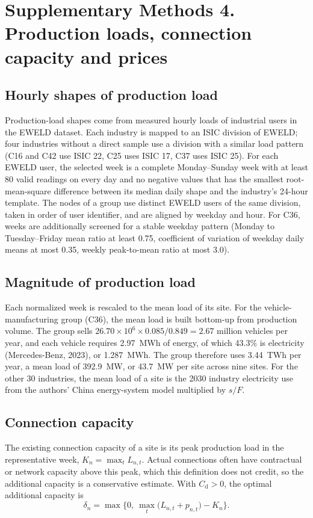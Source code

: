 \documentclass[11pt]{article}
\begin{document}
\section*{Supplementary Methods 4. Production loads, connection capacity and prices}

\subsection*{Hourly shapes of production load}
Production-load shapes come from measured hourly loads of industrial users in the EWELD dataset. Each industry is mapped to an ISIC division of EWELD; four industries without a direct sample use a division with a similar load pattern (C16 and C42 use ISIC 22, C25 uses ISIC 17, C37 uses ISIC 25). For each EWELD user, the selected week is a complete Monday--Sunday week with at least 80 valid readings on every day and no negative values that has the smallest root-mean-square difference between its median daily shape and the industry's 24-hour template. The nodes of a group use distinct EWELD users of the same division, taken in order of user identifier, and are aligned by weekday and hour. For C36, weeks are additionally screened for a stable weekday pattern (Monday to Tuesday--Friday mean ratio at least 0.75, coefficient of variation of weekday daily means at most 0.35, weekly peak-to-mean ratio at most 3.0).

\subsection*{Magnitude of production load}
Each normalized week is rescaled to the mean load of its site. For the vehicle-manufacturing group (C36), the mean load is built bottom-up from production volume. The group sells $26.70\times10^6\times0.085/0.849=2.67$ million vehicles per year, and each vehicle requires 2.97~MWh of energy, of which 43.3\% is electricity (Mercedes-Benz, 2023), or 1.287~MWh. The group therefore uses 3.44~TWh per year, a mean load of 392.9~MW, or 43.7~MW per site across nine sites. For the other 30 industries, the mean load of a site is the 2030 industry electricity use from the authors' China energy-system model multiplied by $s/F$.

\subsection*{Connection capacity}
The existing connection capacity of a site is its peak production load in the representative week, $K_n=\max_tL_{n,t}$. Actual connections often have contractual or network capacity above this peak, which this definition does not credit, so the additional capacity is a conservative estimate. With $C_{\mathrm{d}}>0$, the optimal additional capacity is
\begin{equation}
\delta_n=\max\Big\{0,\ \max_t\big(L_{n,t}+p_{n,t}\big)-K_n\Big\}.\label{eq:delta}
\end{equation}
\end{document}

